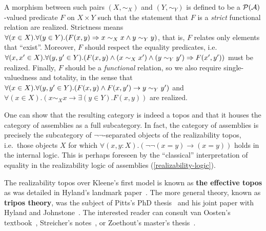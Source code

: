 A morphism between such pairs \((X,\sim_X)\) and \((Y,\sim_Y)\) is defined
to be a \(\mathcal P(\mathcal A)\)\nobreakdash-valued predicate \(F\) on \(X \times Y\)
such that the statement that \(F\) is a \emph{strict} functional relation are
realized.  Strictness means
\(\forall(x\in X).\forall(y\in Y).\pa*{F(x,y) \Rightarrow x \sim_X x \land y
  \sim_Y y}\), that is, \(F\) relates only elements that ``exist''.
%
Moreover, \(F\) should respect the equality predicates, i.e.\
\(\forall(x,x'\in X).\forall(y,y' \in Y).\pa*{F(x,y)\land(x\sim_X
  x')\land(y\sim_Y y') \Rightarrow F(x',y')}\) must be realized.
%
Finally, \(F\) should be a \emph{functional} relation, so we also require
single-valuedness and totality, in the sense that
\(\forall(x\in X).\forall(y,y' \in Y).\pa*{F(x,y) \land F(x,y') \to y \sim_Y
  y'}\) and \(\forall(x \in X).(x \sim_X x \to \exists(y \in Y).F(x,y))\) are
realized.

One can show that the resulting category is indeed a topos and that it houses
the category of assemblies as a full subcategory. In fact, the category of
assemblies is precisely the subcategory of \(\lnot\lnot\)-separated objects of
the realizability topos, i.e.\ those objects \(X\) for which
\(\forall(x,y:X).(\lnot\lnot(x=y) \to (x=y))\) holds in the internal logic.
%
This is perhaps foreseen by the ``classical'' interpretation of equality in the
realizability logic of assemblies (\cref{realizability-logic}).

The realizability topos over Kleene's first model is known as \textbf{the
  effective topos} as was detailed in Hyland's landmark paper~\cite{Hyland1982}.
%
The more general theory, known as \textbf{tripos theory}, was the subject of
Pitts's PhD thesis~\cite{Pitts1981} and his joint paper with Hyland and
Johnstone~\cite{HJP1980}.
%
The interested reader can consult van Oosten's textbook~\cite{vanOosten2008},
Streicher's notes~\cite{Streicher2018}, or Zoethout's master's
thesis~\cite{Zoethout2018}.

